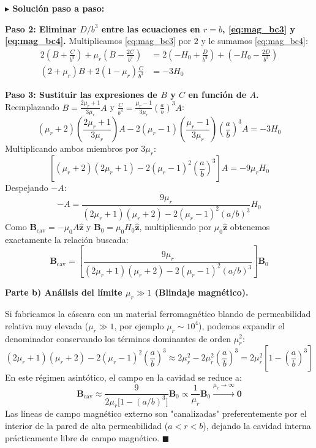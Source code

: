 \documentclass[11pt,a4paper]{book}
\newenvironment{solucion}{%
    \par\medskip\noindent\textbf{\color{blue!65!black}\Large $\blacktriangleright$ Solución paso a paso:}\par\medskip
}{%
    \hfill$\blacksquare$\par\bigskip
}
\newcommand{\zhat}{\hat{\bm{z}}}
\newcommand{\Bvec}{\bm{B}}
\begin{document}
\begin{solucion}
\textbf{Paso 2: Eliminar $D/b^3$ entre las ecuaciones en $r=b$, \eqref{eq:mag_bc3} y \eqref{eq:mag_bc4}.}
Multiplicamos \eqref{eq:mag_bc3} por $2$ y le sumamos \eqref{eq:mag_bc4}:
\begin{align}
    2\left(B + \frac{C}{b^3}\right) + \mu_r\left(B - \frac{2C}{b^3}\right) &= 2\left(-H_0 + \frac{D}{b^3}\right) + \left(-H_0 - \frac{2D}{b^3}\right) \nonumber \\
    (2 + \mu_r)B + 2(1 - \mu_r)\frac{C}{b^3} &= -3H_0
\end{align}

\textbf{Paso 3: Sustituir las expresiones de $B$ y $C$ en función de $A$.}
Reemplazando $B = \frac{2\mu_r + 1}{3\mu_r} A$ y $\frac{C}{b^3} = \frac{\mu_r - 1}{3\mu_r} \left(\frac{a}{b}\right)^3 A$:
\begin{equation}
    (\mu_r + 2)\left(\frac{2\mu_r + 1}{3\mu_r}\right) A - 2(\mu_r - 1)\left(\frac{\mu_r - 1}{3\mu_r}\right)\left(\frac{a}{b}\right)^3 A = -3H_0
\end{equation}
Multiplicando ambos miembros por $3\mu_r$:
\begin{equation}
    \left[ (\mu_r + 2)(2\mu_r + 1) - 2(\mu_r - 1)^2 \left(\frac{a}{b}\right)^3 \right] A = -9\mu_r H_0
\end{equation}
Despejando $-A$:
\begin{equation}
    -A = \frac{9\mu_r}{(2\mu_r + 1)(\mu_r + 2) - 2(\mu_r - 1)^2 (a/b)^3} H_0
\end{equation}
Como $\Bvec_{\text{cav}} = -\mu_0 A \zhat$ y $\Bvec_0 = \mu_0 H_0 \zhat$, multiplicando por $\mu_0 \zhat$ obtenemos exactamente la relación buscada:
\begin{equation}
    \Bvec_{\text{cav}} = \left[ \frac{9\mu_r}{(2\mu_r + 1)(\mu_r + 2) - 2(\mu_r - 1)^2 (a/b)^3} \right] \Bvec_0
\end{equation}

\medskip
\textbf{Parte b) Análisis del límite $\mu_r \gg 1$ (Blindaje magnético).}

Si fabricamos la cáscara con un material ferromagnético blando de permeabilidad relativa muy elevada ($\mu_r \gg 1$, por ejemplo $\mu_r \sim 10^4$), podemos expandir el denominador conservando los términos dominantes de orden $\mu_r^2$:
\begin{equation}
    (2\mu_r + 1)(\mu_r + 2) - 2(\mu_r - 1)^2 \left(\frac{a}{b}\right)^3 \approx 2\mu_r^2 - 2\mu_r^2 \left(\frac{a}{b}\right)^3 = 2\mu_r^2 \left[ 1 - \left(\frac{a}{b}\right)^3 \right]
\end{equation}
En este régimen asintótico, el campo en la cavidad se reduce a:
\begin{equation}
    \Bvec_{\text{cav}} \approx \frac{9}{2\mu_r \big[1 - (a/b)^3\big]} \Bvec_0 \propto \frac{1}{\mu_r} \Bvec_0 \xrightarrow{\mu_r \to \infty} \bm{0}
\end{equation}
Las líneas de campo magnético externo son "canalizadas" preferentemente por el interior de la pared de alta permeabilidad ($a < r < b$), dejando la cavidad interna prácticamente libre de campo magnético.
\end{solucion}
\end{document}
